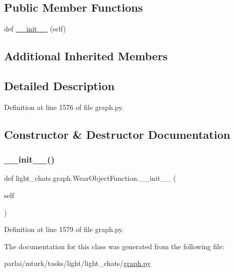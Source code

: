 \subsection*{Public Member Functions}
\begin{DoxyCompactItemize}
\item 
def \hyperlink{classlight__chats_1_1graph_1_1WearObjectFunction_a15f5038591492a7bd7796b664ff94847}{\+\_\+\+\_\+init\+\_\+\+\_\+} (self)
\end{DoxyCompactItemize}
\subsection*{Additional Inherited Members}


\subsection{Detailed Description}
\begin{DoxyVerb}\end{DoxyVerb}
 

Definition at line 1576 of file graph.\+py.



\subsection{Constructor \& Destructor Documentation}
\mbox{\label{classlight__chats_1_1graph_1_1WearObjectFunction_a15f5038591492a7bd7796b664ff94847}} 
\subsubsection{\texorpdfstring{\+\_\+\+\_\+init\+\_\+\+\_\+()}{\_\_init\_\_()}}
{\footnotesize\ttfamily def light\+\_\+chats.\+graph.\+Wear\+Object\+Function.\+\_\+\+\_\+init\+\_\+\+\_\+ (\begin{DoxyParamCaption}\item[{}]{self }\end{DoxyParamCaption})}



Definition at line 1579 of file graph.\+py.



The documentation for this class was generated from the following file\+:\begin{DoxyCompactItemize}
\item 
parlai/mturk/tasks/light/light\+\_\+chats/\hyperlink{parlai_2mturk_2tasks_2light_2light__chats_2graph_8py}{graph.\+py}\end{DoxyCompactItemize}
